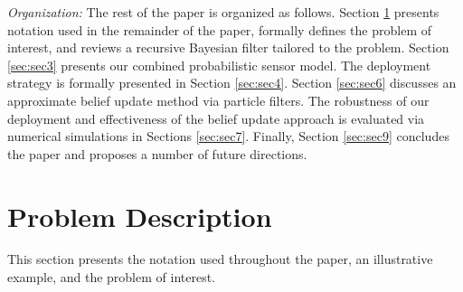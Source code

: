 \documentclass[letterpaper, 10 pt, conference]{ieeeconf}
\begin{document}
\textit{Organization:}
The rest of the paper is organized as follows. 
Section \ref{sec:sec2} presents notation used in the remainder of the paper, formally defines the problem of interest, and reviews a recursive Bayesian filter tailored to the problem.
Section \ref{sec:sec3} presents our combined probabilistic sensor model. 
The deployment strategy is formally presented in Section \ref{sec:sec4}. 
Section \ref{sec:sec6} discusses an approximate belief update method via particle filters. 
The robustness of our deployment and effectiveness of the belief update approach is evaluated via numerical simulations in Sections \ref{sec:sec7}. 
Finally, Section \ref{sec:sec9} concludes the paper and proposes a number of future directions.

%


\section{Problem Description}
\label{sec:sec2}

This section presents the notation used throughout the paper, an illustrative example, and the problem of interest.

\end{document}

